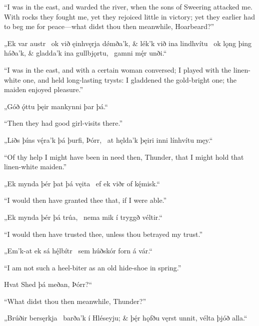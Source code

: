 \bvb “I was in the east, and warded the river, when the sons of Sweering attacked me. With rocks they fought me, yet they rejoiced little in victory; yet they earlier had to beg me for peace—what didst thou then meanwhile, Hoarbeard?”\evb
\evg


\bvg
\bva{}„Ek var austr \hld\ ok við ęinhvęrja dǿmða’k, &
lék’k við ina lindhvítu \hld\ ok lǫng þing háða’k, &
gladda’k ina gullbjǫrtu, \hld\ gamni mę́r unði.“\eva

\bvb “I was in the east, and with a certain woman conversed; I played with the linen-white one, and held long-lasting trysts: I gladdened the gold-bright one; the maiden enjoyed pleasure.”\evb
\evg


\bvg
\bva{}„Góð ǫ́ttu þęir mankynni þar þá.“\eva

\bvb “Then they had good girl-visits there.”\evb
\evg


\bvg
\bva{}„Liðs þíns vę́ra’k þá þurfi, Þórr, \hld\ at hęlda’k þęiri inni línhvítu męy.“\eva

\bvb “Of thy help I might have been in need then, Thunder, that I might hold that linen-white maiden.”\evb
\evg


\bvg
\bva{}„Ek mynda þér þat þá vęita \hld\ ef ek viðr of kę́misk.“\eva

\bvb “I would then have granted thee that, if I were able.”\evb
\evg


\bvg
\bva{}„Ek mynda þér þá trúa, \hld\ nema mik í tryggð véltir.“\eva

\bvb “I would then have trusted thee, unless thou betrayed my trust.”\evb
\evg


\bvg
\bva{}„Em’k-at ek sá hę́lbítr \hld\ sem húðskór forn á vár.“\eva

\bvb “I am not such a heel-biter as an old hide-shoe in spring.”\evb
\evg


\bvg
\bva{}\ind Hvat Shed þá meðan, Þórr?“\eva

\bvb “What didst thou then meanwhile, Thunder?”\evb
\evg


\bvg
\bva{}„Brúðir bersęrkja \hld\ barða’k í Hléseyju; &
þę́r hǫfðu vęrst unnit, \hld vélta þjóð alla.“\eva


